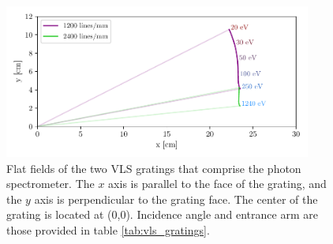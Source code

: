 \begin{figure}
	\centering
	\includegraphics[width=0.9\textwidth]{figures/Beamline/VLS_flat_field.pdf}
	\caption[Flat field of VLS gratings]{Flat fields of the two VLS gratings that comprise the photon spectrometer.  The $x$ axis is parallel to the face of the grating, and the $y$ axis is perpendicular to the grating face.  The center of the grating is located at (0,0).  Incidence angle and entrance arm are those provided in table \ref{tab:vls_gratings}.}
	\label{fig:VLS_flat_field}
\end{figure}




